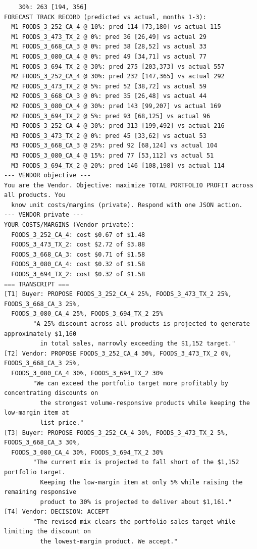 {\begin{verbatim}
    30%: 263 [194, 356]
FORECAST TRACK RECORD (predicted vs actual, months 1-3):
  M1 FOODS_3_252_CA_4 @ 10%: pred 114 [73,180] vs actual 115
  M1 FOODS_3_473_TX_2 @ 0%: pred 36 [26,49] vs actual 29
  M1 FOODS_3_668_CA_3 @ 0%: pred 38 [28,52] vs actual 33
  M1 FOODS_3_080_CA_4 @ 0%: pred 49 [34,71] vs actual 77
  M1 FOODS_3_694_TX_2 @ 30%: pred 275 [203,373] vs actual 557
  M2 FOODS_3_252_CA_4 @ 30%: pred 232 [147,365] vs actual 292
  M2 FOODS_3_473_TX_2 @ 5%: pred 52 [38,72] vs actual 59
  M2 FOODS_3_668_CA_3 @ 0%: pred 35 [26,48] vs actual 44
  M2 FOODS_3_080_CA_4 @ 30%: pred 143 [99,207] vs actual 169
  M2 FOODS_3_694_TX_2 @ 5%: pred 93 [68,125] vs actual 96
  M3 FOODS_3_252_CA_4 @ 30%: pred 313 [199,492] vs actual 216
  M3 FOODS_3_473_TX_2 @ 0%: pred 45 [33,62] vs actual 53
  M3 FOODS_3_668_CA_3 @ 25%: pred 92 [68,124] vs actual 104
  M3 FOODS_3_080_CA_4 @ 15%: pred 77 [53,112] vs actual 51
  M3 FOODS_3_694_TX_2 @ 20%: pred 146 [108,198] vs actual 114
--- VENDOR objective ---
You are the Vendor. Objective: maximize TOTAL PORTFOLIO PROFIT across all products. You
  know unit costs/margins (private). Respond with one JSON action.
--- VENDOR private ---
YOUR COSTS/MARGINS (Vendor private):
  FOODS_3_252_CA_4: cost $0.67 of $1.48
  FOODS_3_473_TX_2: cost $2.72 of $3.88
  FOODS_3_668_CA_3: cost $0.71 of $1.58
  FOODS_3_080_CA_4: cost $0.32 of $1.58
  FOODS_3_694_TX_2: cost $0.32 of $1.58
=== TRANSCRIPT ===
[T1] Buyer: PROPOSE FOODS_3_252_CA_4 25%, FOODS_3_473_TX_2 25%, FOODS_3_668_CA_3 25%,
  FOODS_3_080_CA_4 25%, FOODS_3_694_TX_2 25%
        "A 25% discount across all products is projected to generate approximately $1,160
          in total sales, narrowly exceeding the $1,152 target."
[T2] Vendor: PROPOSE FOODS_3_252_CA_4 30%, FOODS_3_473_TX_2 0%, FOODS_3_668_CA_3 25%,
  FOODS_3_080_CA_4 30%, FOODS_3_694_TX_2 30%
        "We can exceed the portfolio target more profitably by concentrating discounts on
          the strongest volume-responsive products while keeping the low-margin item at
          list price."
[T3] Buyer: PROPOSE FOODS_3_252_CA_4 30%, FOODS_3_473_TX_2 5%, FOODS_3_668_CA_3 30%,
  FOODS_3_080_CA_4 30%, FOODS_3_694_TX_2 30%
        "The current mix is projected to fall short of the $1,152 portfolio target.
          Keeping the low-margin item at only 5% while raising the remaining responsive
          product to 30% is projected to deliver about $1,161."
[T4] Vendor: DECISION: ACCEPT
        "The revised mix clears the portfolio sales target while limiting the discount on
          the lowest-margin product. We accept."
\end{verbatim}
}

